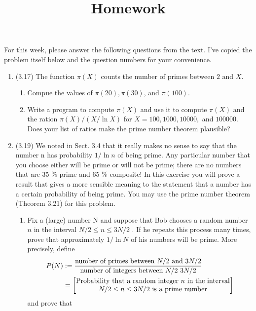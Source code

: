 \documentclass[12pt]{amsart}
\theoremstyle{definition}
\begin{document}
\title{Homework}

\maketitle

For this week, please answer the following questions from the text. 
I've copied the problem itself below and the question numbers for 
your convenience. 

\begin{enumerate}
	\item (3.17) The function $\pi(X)$ counts the number of primes between $2$ and $X$. 
		\begin{enumerate}
		\item Compue the values of $\pi(20),\pi(30)$, and $\pi(100)$. 
		\item Write a program to compute $\pi(X)$ and use it to compute $\pi(X)$ and 
			the ration $\pi(X)/(X/\ln X)$ for $X = 100, 1000, 10000,$ and $100000$. 
			Does your list of ratios make the prime number theorem plausible? 
		\end{enumerate}
	\item (3.19) We noted in Sect. 3.4 that it really makes no sense to say
		that the number n has probability $1/\ln n$ of being prime. Any
		particular number that you choose either will be prime or will
		not be prime; there are no numbers that are 35 \% prime and 65 \%
		composite! In this exercise you will prove a result that gives
		a more sensible meaning to the statement that a number has a
		certain probability of being prime. You may use the prime
		number theorem (Theorem 3.21) for this problem.
		\begin{enumerate}
			\item Fix a (large) number N and suppose that Bob
			chooses a random number $n$ in the interval $N/2
			\leq n \leq 3N/2$ . If he repeats this process many
			times, prove that approximately $1/\ln N$ of his
			numbers will be prime. More precisely, define
			\begin{align*}
				P(N) & := \frac{\text{number of primes between $N/2$ and 
					$3N/2$}}{\text{number of integers between $N/2$ 
					$3N/2$}} \\
				     & = \left[\Centerstack{\text{Probability that a random integer $n$ 
			     in the interval} \newline \text{$N/2 \leq n \leq 3N/2$ is a prime number}} \right]
			\end{align*}
			and prove that 
			\begin{displaymath}

\end{displaymath}
\end{enumerate}
\end{enumerate}
\end{document}
